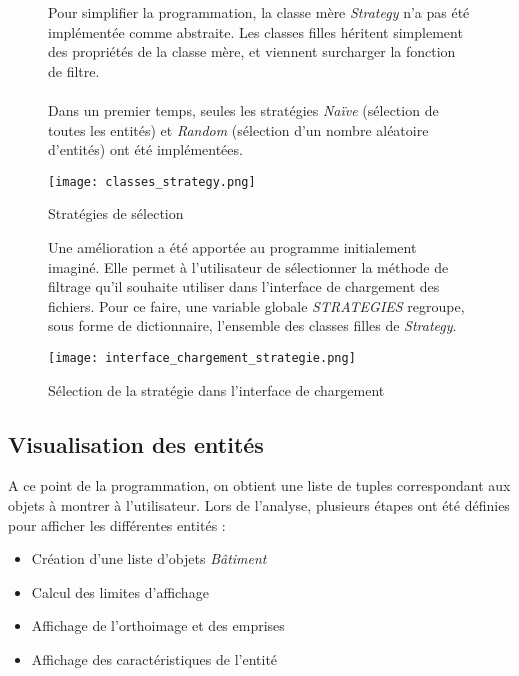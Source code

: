 \begin{figure}[!h]
	\begin{minipage}{0.50\linewidth}\parindent12pt
		\indent Pour simplifier la programmation, la classe mère \textit{Strategy} n'a pas été implémentée comme abstraite. Les classes filles héritent simplement des propriétés de la classe mère, et viennent surcharger la fonction de filtre. \\\\
		\indent Dans un premier temps, seules les stratégies \textit{Naïve} (sélection de toutes les entités) et \textit{Random} (sélection d'un nombre aléatoire d'entités) ont été implémentées.
	\end{minipage}
	\hfill
	\begin{minipage}{0.45\linewidth}
		\centering
		\texttt{[image: classes\_strategy.png]}  \\
		\caption[Stratégies de sélection]{Stratégies de sélection}
		\label{fig:fonctionfiltre}
	\end{minipage}
\end{figure}

\begin{figure}[!h]
	\begin{minipage}{0.50\linewidth}\parindent12pt
		\indent  Une amélioration a été apportée au programme initialement imaginé. Elle permet à l'utilisateur de sélectionner la méthode de filtrage qu'il souhaite utiliser dans l'interface de chargement des fichiers. Pour ce faire, une variable globale \textit{STRATEGIES} regroupe, sous forme de dictionnaire, l'ensemble des classes filles de \textit{Strategy}.
	\end{minipage}
	\hfill
	\begin{minipage}{0.45\linewidth}
		\centering
		\texttt{[image: interface\_chargement\_strategie.png]}  \\
		\caption[Sélection de la stratégie dans l'interface de chargement]{Sélection de la stratégie dans l'interface de chargement}
		\label{fig:interfchargement}
	\end{minipage}
\end{figure}

\subsection{Visualisation des entités}

A ce point de la programmation, on obtient une liste de tuples correspondant aux objets à montrer à l'utilisateur. Lors de l'analyse, plusieurs étapes ont été définies pour afficher les différentes entités :
\begin{itemize}[label=$\rightarrow$]
	\item Création d'une liste d'objets \textit{Bâtiment}
	\item Calcul des limites d'affichage
	\item Affichage de l'orthoimage et des emprises
	\item Affichage des caractéristiques de l'entité
\end{itemize}

